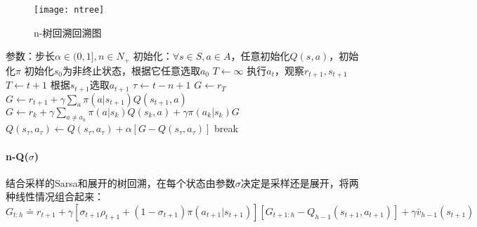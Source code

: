 \documentclass[
12pt, %
a4paper, 
oneside, %
headinclude,footinclude, %
]{scrartcl}
\begin{document}
\begin{figure}[H]
\centering
\texttt{[image: ntree]}
\caption{n-树回溯回溯图}
\end{figure}
\begin{myalgorithm}[n-树回溯]
\State 参数：步长$ \alpha \in (0,1], n \in N_+ $
\State 初始化：$ \forall s \in S, a \in A $，任意初始化$ Q(s, a) $，初始化$ \pi $
\State 初始化$ s_0 $为非终止状态，根据它任意选取$ a_0 $
\State $ T \gets \infty $
\State 执行$ a_t $，观察$ r_{t + 1}, s_{t + 1} $
\State $ T \gets t + 1 $
\Else
\State 根据$ s_{t + 1} $选取$ a_{t + 1} $
\EndIf
\EndIf
\State $ \tau \gets t - n + 1 $ 
\State $ G \gets r_T $ 
\Else
\State $ G \gets r_{t + 1} + \gamma \sum_a \pi(a|s_{t + 1})Q(s_{t + 1}, a) $
\EndIf
{}
\State $ G \gets r_k + \gamma \sum_{a \neq a_k} \pi(a|s_k)Q(s_k,a) + \gamma \pi(a_k|s_k)G $
\EndFor
\State $ Q(s_{\tau}, a_{\tau}) \gets Q(s_{\tau}, a_{\tau}) + \alpha[G - Q(s_{\tau}, a_{\tau})] $
\EndIf
{}
\State break
\EndIf
\EndFor
\EndFor
\end{myalgorithm}
\paragraph{n-Q($ \sigma $)}
结合采样的Sarsa和展开的树回溯，在每个状态由参数$ \sigma $决定是采样还是展开，将两种线性情况组合起来：
$$ G_{t:h} \doteq r_{t + 1} + \gamma [\sigma_{t + 1}\rho_{t + 1} + (1 - \sigma_{t + 1})\pi(a_{t + 1}|s_{t + 1})][G_{t + 1:h} - Q_{h - 1}(s_{t + 1}, a_{t + 1})] + \gamma \bar{v}_{h - 1}(s_{t + 1}) $$
\end{document}
